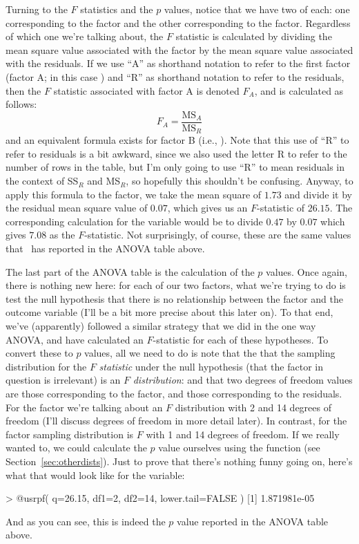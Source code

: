 Turning to the $F$ statistics and the $p$ values, notice that we have two of each: one corresponding to the  factor and the other corresponding to the  factor. Regardless of which one we're talking about, the $F$ statistic is calculated by dividing the mean square value associated with the factor by the mean square value associated with the residuals. If we use ``A'' as shorthand notation to refer to the first factor (factor A; in this case ) and ``R'' as shorthand notation to refer to the residuals, then the $F$ statistic associated with factor A is denoted $F_A$, and is calculated as follows:
$$
F_{A} = \frac{\mbox{MS}_{A}}{\mbox{MS}_{R}}
$$
and an equivalent formula exists for factor B (i.e., ). Note that this use of ``R'' to refer to residuals is a bit awkward, since we also used the letter R to refer to the number of rows in the table, but I'm only going to use ``R'' to mean residuals in the context of SS$_R$ and MS$_R$, so hopefully this shouldn't be confusing. Anyway, to apply this formula to the   factor, we take the mean square of $1.73$ and divide it by the residual mean square value of $0.07$, which gives us an $F$-statistic of $26.15$. The corresponding calculation for the  variable would be to divide $0.47$ by $0.07$ which gives $7.08$ as the $F$-statistic. Not surprisingly, of course, these are the same values that \R\ has reported in the ANOVA table above.

The last part of the ANOVA table is the calculation of the $p$ values. Once again, there is nothing new here: for each of our two factors, what we're trying to do is test the null hypothesis that there is no relationship between the factor and the outcome variable (I'll be a bit more precise about this later on). To that end, we've (apparently) followed a similar strategy that we did in the one way ANOVA, and have calculated an $F$-statistic for each of these hypotheses. To convert these to $p$ values, all we need to do is note that the  that the sampling distribution for the $F$ {\it statistic} under the null hypothesis (that the factor in question is irrelevant) is an $F$ {\it distribution}: and that two degrees of freedom values are those corresponding to the factor, and those corresponding to the residuals. For the  factor we're talking about an $F$ distribution with 2 and 14 degrees of freedom (I'll discuss degrees of freedom in more detail later). In contrast, for the  factor sampling distribution is $F$ with 1 and 14 degrees of freedom. If we really wanted to, we could calculate the $p$ value ourselves using the  function (see Section~\ref{sec:otherdists}). Just to prove that there's nothing funny going on, here's what that would look like for the  variable:
\begin{rblock1}
> @usr{pf( q=26.15, df1=2, df2=14, lower.tail=FALSE )}
[1] 1.871981e-05
\end{rblock1}
And as you can see, this is indeed the $p$ value reported in the ANOVA table above. 

